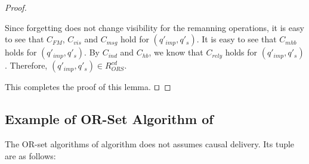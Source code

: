 \begin {proof}
\begin{itemize}
    Since forgetting does not change visibility for the remanning operations, it is easy to see that $C_{\mathit{FM}}$, $C_{\mathit{vis}}$ and $C_{\mathit{msg}}$ hold for $(q'_{\mathit{imp}},q'_s)$. It is easy to see that $C_{\mathit{mhb}}$ holds for $(q'_{\mathit{imp}},q'_s)$. By $C_{\mathit{ind}}$ and $C_{\mathit{hb}}$, we know that $C_{\mathit{rely}}$ holds for $(q'_{\mathit{imp}},q'_s)$. Therefore, $(q'_{\mathit{imp}},q'_s) \in R_{\mathit{ORS}}^{\mathit{cd}}$.
\end{itemize}

This completes the proof of this lemma. $\qed$
\end {proof}






\subsection{Example of OR-Set Algorithm of \cite{Bieniusa:2012}}
\label{subsec:example of or-set algorithm that does not assumes causal delivery}

The OR-set algorithms of \cite{Bieniusa:2012} algorithm does not assumes causal delivery. Its tuple are as follows:

